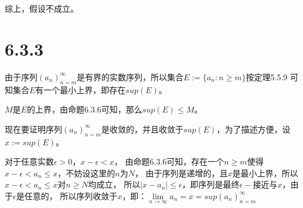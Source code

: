 \documentclass{article}
\theoremstyle{mystyle}
\begin{document}
综上，假设不成立。

\section*{6.3.3}

由于序列$(a_n)_{n=m}^\infty$是有界的实数序列，所以集合$E := \{a_n : n \geq m\}$按定理5.5.9
可知集合$E$有一个最小上界，即存在$sup(E)$。

$M$是$E$的上界，由命题6.3.6可知，那么$sup(E) \leq M$。

现在要证明序列$(a_n)_{n=m}^\infty$是收敛的，并且收敛于$sup(E)$，为了描述方便，设$x:=sup(E)$。

对于任意实数$\epsilon > 0$，$x - \epsilon < x$，
由命题6.3.6可知，存在一个$n \geq m$使得$x-\epsilon < a_n \leq x$，不妨设这里的$n$为$N$，
由于序列是递增的，且$x$是最小上界，所以$x-\epsilon < a_n \leq x$对$n \geq N$均成立，
所以$|x - a_n| \leq \epsilon$，即序列是最终$\epsilon -$接近与$x$，由于$\epsilon$是任意的，
所以序列收敛于$x$，即：$\lim\limits_{n \to \infty} a_n = x = sup(a_n)_{n=m}^\infty$
\end{document}
